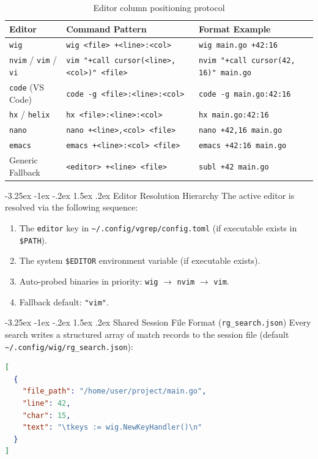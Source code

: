 \documentclass[11pt,a4paper]{article}
\makeatletter
\renewcommand{\subsection}{\@startsection{subsection}{2}{\z@}%
  {-3.25ex \@plus -1ex \@minus -.2ex}%
  {1.5ex \@plus .2ex}%
  {\normalfont\large\bfseries\color{RoyalBlue}}}
\makeatother
\begin{document}
\begin{table}[h!]
\centering
\small
\begin{tabularx}{\textwidth}{llX}
\toprule
\textbf{Editor} & \textbf{Command Pattern} & \textbf{Format Example} \\
\midrule
\texttt{wig} & \texttt{wig <file> +<line>:<col>} & \texttt{wig main.go +42:16} \\
\texttt{nvim} / \texttt{vim} / \texttt{vi} & \texttt{vim "+call cursor(<line>, <col>)" <file>} & \texttt{nvim "+call cursor(42, 16)" main.go} \\
\texttt{code} (VS Code) & \texttt{code -g <file>:<line>:<col>} & \texttt{code -g main.go:42:16} \\
\texttt{hx} / \texttt{helix} & \texttt{hx <file>:<line>:<col>} & \texttt{hx main.go:42:16} \\
\texttt{nano} & \texttt{nano +<line>,<col> <file>} & \texttt{nano +42,16 main.go} \\
\texttt{emacs} & \texttt{emacs +<line>:<col> <file>} & \texttt{emacs +42:16 main.go} \\
Generic Fallback & \texttt{<editor> +<line> <file>} & \texttt{subl +42 main.go} \\
\bottomrule
\end{tabularx}
\caption{Editor column positioning protocol}
\end{table}

\subsection{Editor Resolution Hierarchy}
The active editor is resolved via the following sequence:
\begin{enumerate}[leftmargin=1.5em]
    \item The \texttt{editor} key in \texttt{\textasciitilde/.config/vgrep/config.toml} (if executable exists in \texttt{\$PATH}).
    \item The system \texttt{\$EDITOR} environment variable (if executable exists).
    \item Auto-probed binaries in priority: \texttt{wig} $\longrightarrow$ \texttt{nvim} $\longrightarrow$ \texttt{vim}.
    \item Fallback default: \texttt{"vim"}.
\end{enumerate}

\subsection{Shared Session File Format (\texttt{rg\_search.json})}
Every search writes a structured array of match records to the session file (default \texttt{\textasciitilde/.config/wig/rg\_search.json}):
\begin{lstlisting}[language=json]
[
  {
    "file_path": "/home/user/project/main.go",
    "line": 42,
    "char": 15,
    "text": "\tkeys := wig.NewKeyHandler()\n"
  }
]
\end{lstlisting}
\end{document}
